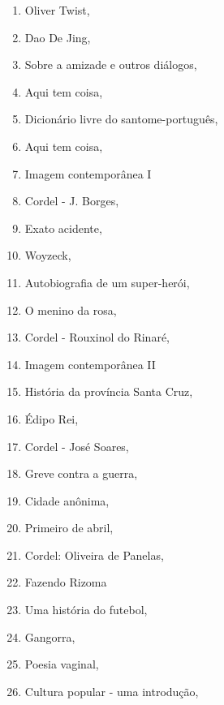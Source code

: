 \begin{multicols}{2}
\begin{enumerate}
\item Oliver Twist, {}
\item Dao De Jing, {}
\item Sobre a amizade e outros diálogos, {}
\item Aqui tem coisa, {}
\item Dicionário livre do santome-português, {}
\item Aqui tem coisa, {}
\item Imagem contemporânea I
\item Cordel - J. Borges, {}
\item Exato acidente, {}
\item Woyzeck, {}
\item Autobiografia de um super-herói, {}
\item O menino da rosa, {}
\item Cordel - Rouxinol do Rinaré, {}
\item Imagem contemporânea II
\item História da província Santa Cruz, {}
\item Édipo Rei, {}
\item Cordel - José Soares, {}
\item Greve contra a guerra, {}
\item Cidade anônima, {}
\item Primeiro de abril, {}
\item Cordel: Oliveira de Panelas, {}
\item Fazendo Rizoma
\item Uma história do futebol, {}
\item Gangorra, {}
\item Poesia vaginal, {}
\item Cultura popular - uma introdução, {}

\end{enumerate}
\end{multicols}

